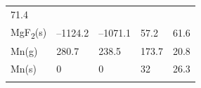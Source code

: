 \documentclass[
]{book}
\theoremstyle{definition}
\theoremstyle{definition}
\theoremstyle{definition}
\theoremstyle{remark}
\begin{document}
\begin{longtable}[]{@{}lllll@{}}
\begin{minipage}[t]{0.18\columnwidth}
71.4\strut
\end{minipage}\tabularnewline
\begin{minipage}[t]{0.10\columnwidth}\raggedright
MgF\textsubscript{2}(s)\strut
\end{minipage} & \begin{minipage}[t]{0.19\columnwidth}\raggedright
--1124.2\strut
\end{minipage} & \begin{minipage}[t]{0.20\columnwidth}\raggedright
--1071.1\strut
\end{minipage} & \begin{minipage}[t]{0.18\columnwidth}\raggedright
57.2\strut
\end{minipage} & \begin{minipage}[t]{0.18\columnwidth}\raggedright
61.6\strut
\end{minipage}\tabularnewline
\begin{minipage}[t]{0.10\columnwidth}\raggedright
Mn(g)\strut
\end{minipage} & \begin{minipage}[t]{0.19\columnwidth}\raggedright
280.7\strut
\end{minipage} & \begin{minipage}[t]{0.20\columnwidth}\raggedright
238.5\strut
\end{minipage} & \begin{minipage}[t]{0.18\columnwidth}\raggedright
173.7\strut
\end{minipage} & \begin{minipage}[t]{0.18\columnwidth}\raggedright
20.8\strut
\end{minipage}\tabularnewline
\begin{minipage}[t]{0.10\columnwidth}\raggedright
Mn(s)\strut
\end{minipage} & \begin{minipage}[t]{0.19\columnwidth}\raggedright
0\strut
\end{minipage} & \begin{minipage}[t]{0.20\columnwidth}\raggedright
0\strut
\end{minipage} & \begin{minipage}[t]{0.18\columnwidth}\raggedright
32\strut
\end{minipage} & \begin{minipage}[t]{0.18\columnwidth}\raggedright
26.3\strut
\end{minipage}\tabularnewline
\begin{minipage}[t]{0.10\columnwidth}\raggedright

\end{minipage}
\end{longtable}
\end{document}
